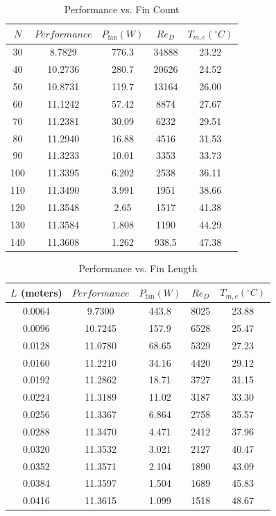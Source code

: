 \documentclass[12pt, titlepage]{article}
\begin{document}
\begin{table}[H]
\centering
\caption{Performance vs. Fin Count}
\begin{tabular}{|c|c|c|c|c|}
\hline
$N$ & $Performance$ & $P_{\mathrm{fan}} (W)$ & $Re_D$ & $T_{m,e} (^\circ C)$ \\
\hline
30 & 8.7829 & 776.3 & 34888 & 23.22 \\\hline
40 & 10.2736 & 280.7 & 20626 & 24.52 \\\hline
50 & 10.8731 & 119.7 & 13164 & 26.00 \\\hline
60 & 11.1242 & 57.42 & 8874 & 27.67 \\\hline
70 & 11.2381 & 30.09 & 6232 & 29.51 \\\hline
80 & 11.2940 & 16.88 & 4516 & 31.53 \\\hline
90 & 11.3233 & 10.01 & 3353 & 33.73 \\\hline
100 & 11.3395 & 6.202 & 2538 & 36.11 \\\hline
110 & 11.3490 & 3.991 & 1951 & 38.66 \\\hline
120 & 11.3548 & 2.65 & 1517 & 41.38 \\\hline
130 & 11.3584 & 1.808 & 1190 & 44.29 \\\hline
140 & 11.3608 & 1.262 & 938.5 & 47.38 \\\hline
\end{tabular}
\end{table}

\begin{table}[H]
\centering
\caption{Performance vs. Fin Length}
\begin{tabular}{|c|c|c|c|c|}
\hline
$L$ (meters) & $Performance$ & $P_{\mathrm{fan}} (W)$ & $Re_D$ & $T_{m,e} (^\circ C)$ \\
\hline
0.0064 & 9.7300 & 443.8 & 8025 & 23.88 \\\hline
0.0096 & 10.7245 & 157.9 & 6528 & 25.47 \\\hline
0.0128 & 11.0780 & 68.65 & 5329 & 27.23 \\\hline
0.0160 & 11.2210 & 34.16 & 4420 & 29.12 \\\hline
0.0192 & 11.2862 & 18.71 & 3727 & 31.15 \\\hline
0.0224 & 11.3189 & 11.02 & 3187 & 33.30 \\\hline
0.0256 & 11.3367 & 6.864 & 2758 & 35.57 \\\hline
0.0288 & 11.3470 & 4.471 & 2412 & 37.96 \\\hline
0.0320 & 11.3532 & 3.021 & 2127 & 40.47 \\\hline
0.0352 & 11.3571 & 2.104 & 1890 & 43.09 \\\hline
0.0384 & 11.3597 & 1.504 & 1689 & 45.83 \\\hline
0.0416 & 11.3615 & 1.099 & 1518 & 48.67 \\\hline
\end{tabular}
\end{table}
\end{document}
